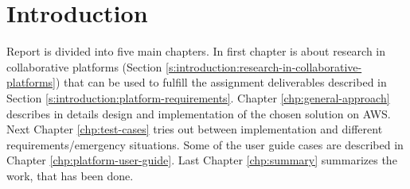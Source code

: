 \chapter{Introduction} \label{chp:introduction}
	Report is divided into five main chapters. In first chapter is about research in collaborative platforms (Section \ref{s:introduction:research-in-collaborative-platforms}) that can be used to fulfill the assignment deliverables described in Section \ref{s:introduction:platform-requirements}. Chapter \ref{chp:general-approach} describes in details design and implementation of the chosen solution on \gls{AWS}. Next Chapter \ref{chp:test-cases} tries out between implementation and different requirements/emergency situations. Some of the user guide cases are described in Chapter \ref{chp:platform-user-guide}. Last Chapter \ref{chp:summary} summarizes the work, that has been done.
	
	